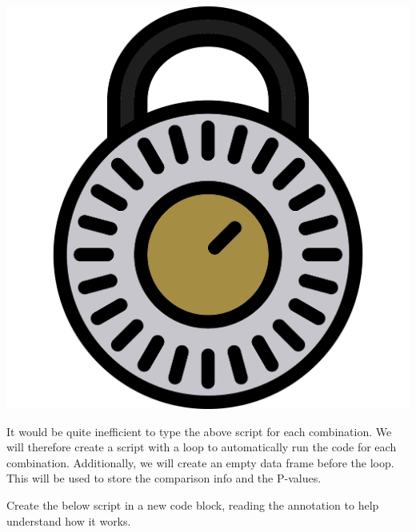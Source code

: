 \documentclass[
]{book}
\begin{document}
\includegraphics{figures/combination_lock_2.png}

It would be quite inefficient to type the above script for each combination.
We will therefore create a script with a loop to automatically run the code for each combination.
Additionally, we will create an empty data frame before the loop.
This will be used to store the comparison info and the P-values.

Create the below script in a new code block, reading the annotation to help understand how it works.
\end{document}
